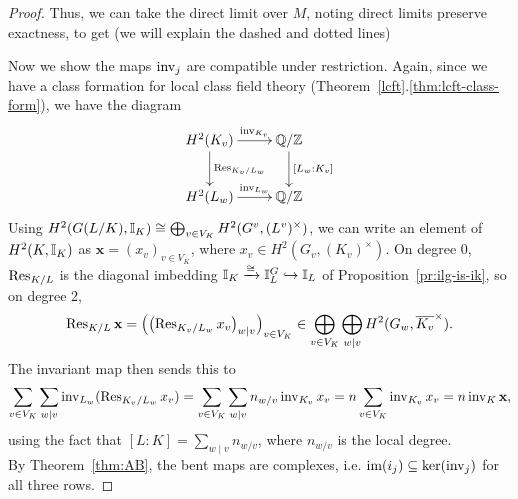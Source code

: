 \begin{proof}
Thus, we can take the direct limit over $M$, noting direct limits preserve exactness, to get (we will explain the dashed and dotted lines)
\eeq

Now we show the maps $\operatorname{inv}_j$ are compatible under restriction. Again, since we have a class formation for local class field theory (Theorem~\ref{lcft}.\ref{thm:lcft-class-form}), we have the diagram
\[
\xymatrix{
H^2(K_v)\ar[r]^-{\inv_{K_v}}\ar[d]^{\Res_{K_v/L_w}} & \Q/\Z\ar[d]^{[L_w:K_v]} \\
H^2(L_w)\ar[r]^-{\inv_{L_w}} & \Q/\Z
}
\]
Using $H^2(G(L/K),\mathbb{I}_K)\cong \bigoplus_{v\in V_K} H^2(G^v,(L^v)^{\times})$, we can write an element of $H^2(K,\mathbb{I}_K)$ as $\mathbf x=(x_v)_{v\in V_K}$, where $x_v\in H^2(G_v,(K_v)^{\times})$. On degree 0, $\operatorname{Res}_{K/L}$ is the diagonal imbedding $\mathbb{I}_K\xrightarrow{\cong} \mathbb{I}_L^G\hookrightarrow \mathbb{I}_L$ of Proposition~\ref{pr:ilg-is-ik}, so on degree 2,
\[
\operatorname{Res}_{K/L}\mathbf x=\left( {\left( {\operatorname{Res}_{K_v/L_w}x_v} \right)_{w\mid v}} \right)_{v\in V_K}\in \bigoplus_{v\in V_K}
\bigoplus_{w\mid v} H^2(G_w,\overline{K_v}^{\times}).
\]
The invariant map then sends this to
\[
\sum_{v\in V_K} \sum_{w\mid v} \operatorname{inv}_{L_w}(\operatorname{Res}_{K_v/L_w}x_v) = 
\sum_{v\in V_K}\sum_{w\mid v} n_{w/v} \operatorname{inv}_{K_v} x_v
=n\sum_{v\in V_K} \operatorname{inv}_{K_v}x_v=n\operatorname{inv}_K\mathbf x,
\]
using the fact that $[L:K]=\sum_{w\mid v}n_{w/v}$, where $n_{w/v}$ is the local degree.\\

By Theorem~\ref{thm:AB}, the bent maps are complexes, i.e. $\text{im}(i_j)\subseteq \ker(\operatorname{inv}_j)$ for all three rows. %


\end{proof}
